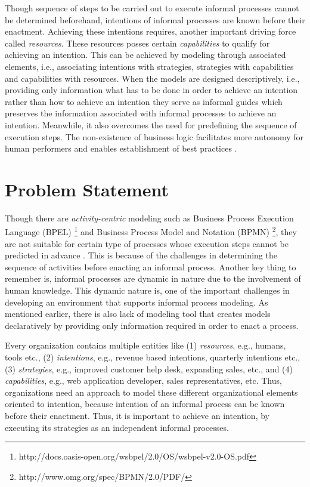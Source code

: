 Though sequence of steps to be carried out to execute informal processes cannot be determined beforehand, intentions of informal processes are known before their enactment. Achieving these intentions requires, another important driving force called \textit{resources}. These resources posses certain \textit{capabilities} to qualify for achieving an intention. This can be achieved by modeling through associated elements, i.e., associating intentions with strategies, strategies with capabilities and capabilities with resources. When the models are designed descriptively, i.e., providing only information what has to be done in order to achieve an intention rather than how to achieve an intention they serve as informal guides which preserves the information associated with informal processes to achieve an intention. Meanwhile, it also overcomes the need for predefining the sequence of execution steps. The non-existence of business logic facilitates more autonomy for human performers and enables establishment of best practices \cite{Sungur2014a}.

\section{Problem Statement}
\label{sec:problemstatement}
Though there are \textit{activity-centric} modeling such as Business Process Execution Language (BPEL) \footnote{http://docs.oasis-open.org/wsbpel/2.0/OS/wsbpel-v2.0-OS.pdf} and Business Process Model and Notation (BPMN) \footnote{http://www.omg.org/spec/BPMN/2.0/PDF/}, they are not suitable for certain type of processes whose execution steps cannot be predicted in advance \cite{Sungur2014a}. This is because of the challenges in determining the sequence of activities before enacting an informal process. Another key thing to remember is, informal processes are dynamic in nature due to the involvement of human knowledge. This dynamic nature is, one of the important challenges in developing an environment that supports informal process modeling. As mentioned earlier, there is also lack of modeling tool that creates models declaratively by providing only information required in order to enact a process. 

Every organization contains multiple entities like (1) \textit{resources}, e.g., humans, tools etc., (2) \textit{intentions}, e.g., revenue based intentions, quarterly intentions etc., (3) \textit{strategies}, e.g., improved customer help desk, expanding sales, etc., and (4) \textit{capabilities}, e.g., web application developer, sales representatives, etc. Thus, organizations need an approach to model these different organizational elements oriented to intention, because intention of an informal process can be known before their enactment. Thus, it is important to achieve an intention, by executing its strategies as an independent informal processes.  

